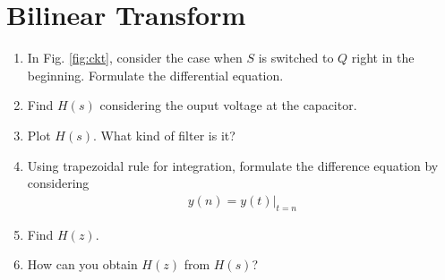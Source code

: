 \documentclass[journal,12pt,twocolumn]{IEEEtran}
\renewcommand\thesection{\arabic{section}}
\begin{document}
 \section{Bilinear Transform}
\begin{enumerate}[label=\arabic*.,ref=\thesection.\theenumi]
\item In Fig. 
			\ref{fig:ckt},
			consider the case when $S$ is switched to $Q$ right in the beginning. Formulate the differential equation.
		\item 			Find $H(s)$ considering the ouput voltage at the capacitor.
		\item Plot $H(s)$.  What kind of filter is it?
		\item Using trapezoidal rule for integration, formulate the difference equation
			by considering 
		\begin{align}
			y(n) = y(t)\vert_{t=n}
		\end{align}
	\item Find $H(z)$.
	\item How can you obtain $H(z)$ from $H(s)$?
	\end{enumerate}
\end{document}
